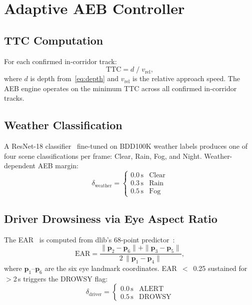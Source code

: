 \documentclass[journal]{IEEEtran}
\begin{document}
\section{Adaptive AEB Controller}
\label{sec:aeb}

\subsection{TTC Computation}

For each confirmed in-corridor track:
\begin{equation}
  \text{TTC} = d \;/\; v_\text{rel},
  \label{eq:ttc}
\end{equation}
where $d$ is depth from~\eqref{eq:depth} and $v_\text{rel}$ is the
relative approach speed.
The AEB engine operates on the minimum TTC across all confirmed
in-corridor tracks.

\subsection{Weather Classification}

A ResNet-18 classifier~\cite{he2016} fine-tuned on BDD100K weather
labels produces one of four scene classifications per frame:
Clear, Rain, Fog, and Night.
Weather-dependent AEB margin:
\begin{equation}
  \delta_\text{weather} =
  \begin{cases}
    0.0\,\text{s} & \text{Clear}\\
    0.3\,\text{s} & \text{Rain}\\
    0.5\,\text{s} & \text{Fog}
  \end{cases}
  \label{eq:delta_w}
\end{equation}

\subsection{Driver Drowsiness via Eye Aspect Ratio}

The EAR~\cite{soukupova2016} is computed from dlib's 68-point
predictor~\cite{king2009}:
\begin{equation}
  \text{EAR} = \frac{\|\mathbf{p}_2-\mathbf{p}_6\| +
                      \|\mathbf{p}_3-\mathbf{p}_5\|}
                     {2\,\|\mathbf{p}_1-\mathbf{p}_4\|},
  \label{eq:ear}
\end{equation}
where $\mathbf{p}_1$--$\mathbf{p}_6$ are the six eye landmark
coordinates.
EAR~$<$~0.25 sustained for~$>$2\,s triggers the DROWSY flag:
\begin{equation}
  \delta_\text{driver} =
  \begin{cases}
    0.0\,\text{s} & \text{ALERT}\\
    0.5\,\text{s} & \text{DROWSY}
  \end{cases}
  \label{eq:delta_d}
\end{equation}
\end{document}
